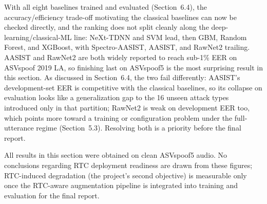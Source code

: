 With all eight baselines trained and evaluated (Section~6.4), the accuracy/efficiency trade-off motivating the classical baselines can now be checked directly, and the ranking does not split cleanly along the deep-learning/classical-ML line: NeXt-TDNN and SVM lead, then GBM, Random Forest, and XGBoost, with Spectro-AASIST, AASIST, and RawNet2 trailing. AASIST and RawNet2 are both widely reported to reach sub-1\% EER on ASVspoof 2019 LA, so finishing last on ASVspoof5 is the most surprising result in this section. As discussed in Section~6.4, the two fail differently: AASIST's development-set EER is competitive with the classical baselines, so its collapse on evaluation looks like a generalization gap to the 16 unseen attack types introduced only in that partition; RawNet2 is weak on development EER too, which points more toward a training or configuration problem under the full-utterance regime (Section~5.3). Resolving both is a priority before the final report.

All results in this section were obtained on clean ASVspoof5 audio. No conclusions regarding RTC deployment readiness are drawn from these figures; RTC-induced degradation (the project's second objective) is measurable only once the RTC-aware augmentation pipeline is integrated into training and evaluation for the final report.